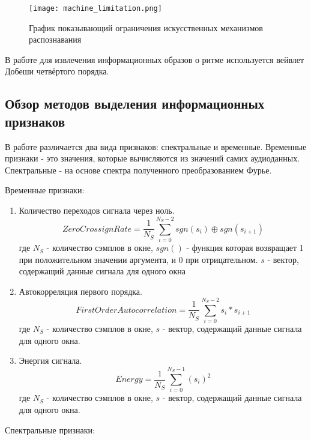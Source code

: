 \begin{figure}[ht]
\centering
  \texttt{[image: machine\_limitation.png]}
  \caption{График показывающий ограничения искусственных механизмов распознавания}
  \label{fig:domain:machine_limitation}
\end{figure}

В работе для извлечения информационных образов о ритме используется вейвлет Добеши четвёртого порядка. 

\subsection{Обзор методов выделения информационных признаков}
\label{sub:domain:feature_extraction}
В работе различается два вида признаков: спектральные и временные. Временные признаки - это значения, которые вычисляются из значений самих аудиоданных. Спектральные -  на основе спектра полученного преобразованием Фурье. 

Временные признаки:
\begin{enumerate}[label=\arabic*.]
\item Количество переходов сигнала через ноль.
\begin{equation}\label{eq:zcr}
ZeroCrossignRate =  \frac{1}{N_S} \sum \limits_{i=0}^{N_S - 2} sgn(s_i)  \oplus sgn(s_{i+1})
\end{equation}  
где $ N_S $ - количество сэмплов в окне, $ sgn() $ - функция которая возвращает 1 при положительном значении аргумента, и 0 при отрицательном.  $ s $ - вектор, содержащий данные сигнала для одного окна	
\item Автокорреляция первого порядка.
\begin{equation}\label{eq:autocorrelation}
FirstOrderAutocorrelation =  \frac{1}{N_S} \sum \limits_{i=0}^{N_S - 2} s_i  * s_{i+1}
\end{equation}  
где $ N_S $ - количество сэмплов в окне,  $ s $ - вектор, содержащий данные сигнала для одного окна.	
\item Энергия сигнала.
\begin{equation}\label{eq:energy}
Energy =  \frac{1}{N_S} \sum \limits_{i=0}^{N_S - 1} ( s_i )^2
\end{equation}  
где $ N_S $ - количество сэмплов в окне,  $ s $ - вектор, содержащий данные сигнала для одного окна.	
\end{enumerate}

Спектральные признаки:

